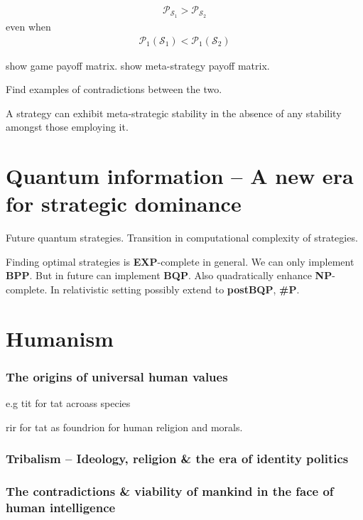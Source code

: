 \documentclass[twocolumn, aps, rmp, amsmath, amssymb, nofootinbib, superscriptaddress, longbibliography, floatfix, table-of-contents, eqsecnum]{revtex4-1}
\begin{document}
\begin{align}
\mathcal{P}_{\mathcal{S}_1} > \mathcal{P}_{\mathcal{S}_2}	
\end{align}
even when
\begin{align}
\mathcal{P}_1(\mathcal{S}_1) < \mathcal{P}_1(\mathcal{S}_2)
\end{align}

show game payoff matrix. show meta-strategy payoff matrix.

Find examples of contradictions between the two.

A strategy can exhibit meta-strategic stability in the absence of any stability amongst those employing it.

%
%

\part{Quantum information -- A new era for strategic dominance}

Future quantum strategies. Transition in computational complexity of strategies.

Finding optimal strategies is \textbf{EXP}-complete in general. We can only implement \textbf{BPP}. But in future can implement \textbf{BQP}. Also quadratically enhance \textbf{NP}-complete. In relativistic setting possibly extend to \textbf{postBQP}, \textbf{\#P}.

%
%

\part{Humanism}

\section{The origins of universal human values}

e.g tit for tat acroass species

rir for tat as foundrion for human religion and morals.

\section{Tribalism -- Ideology, religion \& the era of identity politics}

\section{The contradictions \& viability of mankind in the face of human intelligence}
\end{document}

